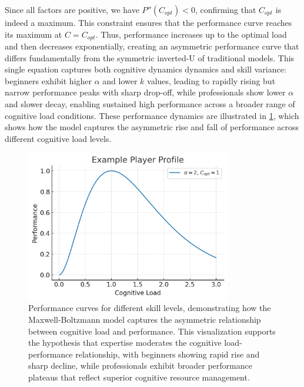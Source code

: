 \documentclass{article}
\begin{document}
Since all factors are positive, we have $P''(C_{opt}) < 0$, confirming that $C_{opt}$ is indeed a maximum. This
constraint ensures that the performance curve reaches its maximum at $C = C_{opt}$. Thus, performance increases up to
the optimal load and then decreases exponentially, creating an asymmetric performance curve that differs fundamentally
from the symmetric inverted-U of traditional models.  This single equation captures both cognitive dynamics dynamics and
skill variance: beginners exhibit higher $\alpha$ and lower $k$ values, leading to rapidly rising but narrow performance
peaks with sharp drop-off, while professionals show lower $\alpha$ and slower decay, enabling sustained high performance
across a broader range of cognitive load conditions.  These performance dynamics are illustrated in
\cref{fig:example_player_performance}, which shows how the model captures the asymmetric rise and fall of performance
across different cognitive load levels.

\begin{figure}[h]
    \centering
    \includegraphics[width=0.8\textwidth]{figures/example_player_performance.png}
    \caption{Performance curves for different skill levels, demonstrating how the Maxwell-Boltzmann model captures
the asymmetric relationship between cognitive load and performance. This visualization supports the hypothesis that 
expertise moderates the cognitive load-performance relationship, with beginners showing rapid rise and sharp decline,
while professionals exhibit broader performance plateaus that reflect superior cognitive resource management.}
    \label{fig:example_player_performance}
\end{figure}
\end{document}
